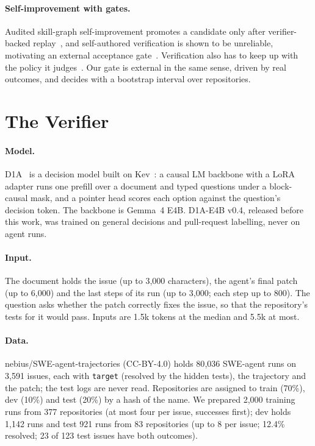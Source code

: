 \documentclass[11pt]{article}
\begin{document}
\paragraph{Self-improvement with gates.} Audited skill-graph self-improvement promotes a candidate only after verifier-backed replay~\cite{asgsi}, and
self-authored verification is shown to be unreliable, motivating an external acceptance gate~\cite{seal}. Verification also has to keep up with the policy it
judges~\cite{horizon}. Our gate is external in the same sense, driven by real outcomes, and decides with a bootstrap interval over repositories.

\section{The Verifier}\label{sec:verifier}
\paragraph{Model.} D1A~\cite{d1a} is a decision model built on Kev~\cite{kev}: a causal LM backbone with a LoRA adapter runs one prefill over a document and
typed questions under a block-causal mask, and a pointer head scores each option against the question's decision token. The backbone is Gemma~4 E4B.
D1A-E4B v0.4, released before this work, was trained on general decisions and pull-request labelling, never on agent runs.

\paragraph{Input.} The document holds the issue (up to 3{,}000 characters), the agent's final patch (up to 6{,}000) and the last steps of its run
(up to 3{,}000; each step up to 800). The question asks whether the patch correctly fixes the issue, so that the repository's tests for it would pass.
Inputs are 1.5k tokens at the median and 5.5k at most.

\paragraph{Data.} nebius/SWE-agent-trajectories (CC-BY-4.0) holds 80{,}036 SWE-agent runs on 3{,}591 issues, each with \texttt{target}
(resolved by the hidden tests), the trajectory and the patch; the test logs are never read. Repositories are assigned to train (70\%), dev (10\%) and test (20\%)
by a hash of the name. We prepared 2{,}000 training runs from 377 repositories (at most four per issue, successes first); dev holds 1{,}142 runs and test
921 runs from 83 repositories (up to 8 per issue; 12.4\% resolved; 23 of 123 test issues have both outcomes).
\end{document}
